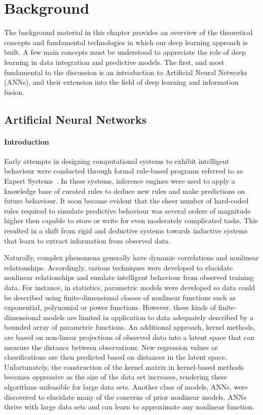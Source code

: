 \chapter{Background}\label{chap:background}

The background material in this chapter provides an overview of the theoretical concepts and fundamental technologies in which our deep learning approach is built. A few main concepts must be understood to appreciate the role of deep learning in data integration and predictive models. The first, and most fundamental to the discussion is an introduction to Artificial Neural Networks (ANNs), and their extension into the field of deep learning and information fusion. 

\section{Artificial Neural Networks}\label{sec:ann}
\subsubsection{Introduction}

Early attempts in designing computational systems to exhibit intelligent behaviour were conducted through formal rule-based programs referred to as Expert Systems~\cite{weiss1991computer}. In these systems, inference engines were used to apply a knowledge base of curated rules to deduce new rules and make predictions on future behaviour. It soon became evident that the sheer number of hard-coded rules required to simulate predictive behaviour was several orders of magnitude higher then capable to store or write for even moderately complicated tasks. This resulted in a shift from rigid and deductive systems towards inductive systems that learn to extract information from observed data. 

Naturally, complex phenomena generally have dynamic correlations and nonlinear relationships. Accordingly, various techniques were developed to elucidate nonlinear relationships and emulate intelligent behaviour from observed training data. For instance, in statistics, parametric models were developed so data could be described using finite-dimensional classes of nonlinear functions such as exponential, polynomial or power functions. However, these kinds of finite-dimensional models are limited in application to data adequately described by a bounded array of parametric functions. An additional approach, kernel methods, are based on non-linear projections of observed data into a latent space that can measure the distance between observations. New regression values or classifications are then predicted based on distances in the latent space. Unfortunately, the construction of the kernel matrix in kernel-based methods becomes oppressive as the size of the data set increases, rendering these algorithms unfeasible for large data sets. Another class of models, ANNs, were discovered to elucidate many of the concerns of prior nonlinear models. ANNs thrive with large data sets and can learn to approximate any nonlinear function.

